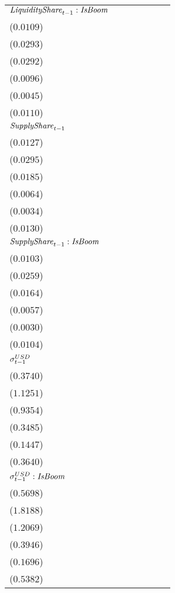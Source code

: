 \begin{tabular}{lllllll}
${\it LiquidityShare}_{t-1}:{\it IsBoom}$ & \makecell{$0.0010^{}$ \\ ($0.0109$)} & \makecell{$-0.0563^{*}$ \\ ($0.0293$)} & \makecell{$-0.0146^{}$ \\ ($0.0292$)} & \makecell{$0.0113^{}$ \\ ($0.0096$)} & \makecell{$-0.0018^{}$ \\ ($0.0045$)} & \makecell{$0.0033^{}$ \\ ($0.0110$)} \\
${\it SupplyShare}_{t-1}$ & \makecell{$0.0463^{***}$ \\ ($0.0127$)} & \makecell{$0.1243^{***}$ \\ ($0.0295$)} & \makecell{$0.0867^{***}$ \\ ($0.0185$)} & \makecell{$0.0235^{***}$ \\ ($0.0064$)} & \makecell{$0.0009^{}$ \\ ($0.0034$)} & \makecell{$0.0494^{***}$ \\ ($0.0130$)} \\
${\it SupplyShare}_{t-1}:{\it IsBoom}$ & \makecell{$-0.0179^{*}$ \\ ($0.0103$)} & \makecell{$-0.0083^{}$ \\ ($0.0259$)} & \makecell{$-0.0374^{**}$ \\ ($0.0164$)} & \makecell{$-0.0104^{*}$ \\ ($0.0057$)} & \makecell{$0.0056^{*}$ \\ ($0.0030$)} & \makecell{$-0.0209^{**}$ \\ ($0.0104$)} \\
${\it \sigma}^{USD}_{t-1}$ & \makecell{$0.4480^{}$ \\ ($0.3740$)} & \makecell{$3.7846^{***}$ \\ ($1.1251$)} & \makecell{$1.3378^{}$ \\ ($0.9354$)} & \makecell{$0.6746^{*}$ \\ ($0.3485$)} & \makecell{$0.1992^{}$ \\ ($0.1447$)} & \makecell{$0.4438^{}$ \\ ($0.3640$)} \\
${\it \sigma}^{USD}_{t-1}:{\it IsBoom}$ & \makecell{$0.1881^{}$ \\ ($0.5698$)} & \makecell{$0.3100^{}$ \\ ($1.8188$)} & \makecell{$-0.1778^{}$ \\ ($1.2069$)} & \makecell{$-0.5772^{}$ \\ ($0.3946$)} & \makecell{$-0.3098^{*}$ \\ ($0.1696$)} & \makecell{$0.2280^{}$ \\ ($0.5382$)} \\

\end{tabular}
